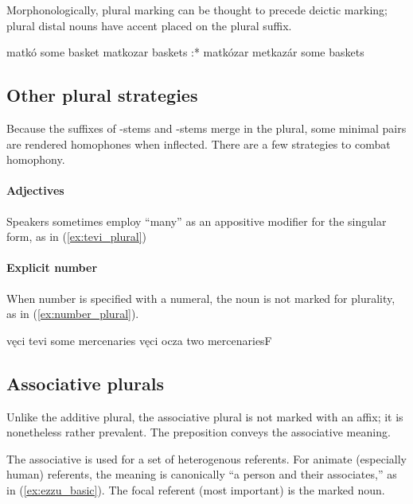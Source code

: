Morphonologically, plural marking can be thought to precede deictic marking; plural distal nouns have accent placed on the plural suffix.

\begin{subexamples}
    \ex
        \script matkó
        \tr some basket
    \ex 
        \script matkozar
        \tr baskets
    \ex 
        \script:* matkózar
    \ex
        \script metkazár
        \tr some baskets
\end{subexamples}

\subsection{Other plural strategies}
Because the suffixes of -stems and -stems merge in the plural, some minimal pairs are rendered homophones when inflected. There are a few strategies to combat homophony. 

\paragraph{Adjectives}
Speakers sometimes employ  “many” as an appositive modifier for the singular form, as in (\ref{ex:tevi_plural})

\paragraph{Explicit number}
When number is specified with a numeral, the noun is not marked for plurality, as in (\ref{ex:number_plural}).

\begin{subexamples}
    \ex \label{ex:tevi_plural}
        \script vęci tevi
        \tr some mercenaries
    \ex \label{ex:number_plural}
        \script vęci ocza
        \tr two mercenariesF
\end{subexamples}

\subsection{Associative plurals}
Unlike the additive plural, the associative plural is not marked with an affix; it is nonetheless rather prevalent. The preposition  conveys the associative meaning.%

The associative is used for a set of heterogenous referents. For animate (especially human) referents, the meaning is canonically “a person and their associates,” as in (\ref{ex:ezzu_basic}). The focal referent (\ie most important) is the marked noun.

